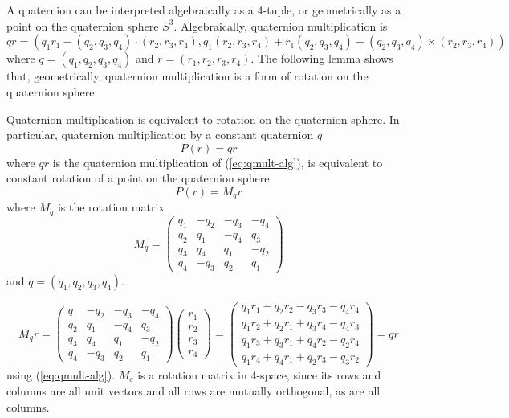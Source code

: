 \section{}

A quaternion can be interpreted algebraically as a 4-tuple,
or geometrically as a point on the quaternion sphere $S^3$.
Algebraically, quaternion multiplication \cite{hamilton69} is
\begin{equation}
\label{eq:qmult-alg}
	qr = (q_1 r_1 - (q_2,q_3,q_4) \cdot (r_2,r_3,r_4),
	      q_1 (r_2,r_3,r_4) + r_1 (q_2,q_3,q_4) + 
	      (q_2,q_3,q_4) \times (r_2,r_3,r_4))
\end{equation}
where $q=(q_1,q_2,q_3,q_4)$ and $r=(r_1,r_2,r_3,r_4)$.
The following lemma shows that, geometrically, quaternion multiplication
is a form of rotation on the quaternion sphere.

\begin{lemma}
\label{lem:multisrotation}
Quaternion multiplication is equivalent to rotation
on the quaternion sphere.
In particular, quaternion multiplication by a constant quaternion $q$
\[
  P(r) = qr
\]
where $qr$ is the quaternion multiplication of (\ref{eq:qmult-alg}),
is equivalent to constant rotation of a point on the quaternion sphere
\[
  P(r) = M_q r
\]
where $M_q$ is the rotation matrix
\begin{equation}
M_q = 
	\left( \begin{array}{cccc}
	q_1 & -q_2 & -q_3 & -q_4 \\
	q_2 & q_1  & -q_4 & q_3  \\
	q_3 & q_4  & q_1  & -q_2 \\
	q_4 & -q_3 & q_2  & q_1
	\end{array} \right)
\end{equation}
and $q = (q_1,q_2,q_3,q_4)$.
\end{lemma}
\prf
\[
M_q r = 
	\left( \begin{array}{cccc}
	q_1 & -q_2 & -q_3 & -q_4 \\
	q_2 & q_1  & -q_4 & q_3  \\
	q_3 & q_4  & q_1  & -q_2 \\
	q_4 & -q_3 & q_2  & q_1
	\end{array} \right)
	\left( \begin{array}{c} r_1 \\ r_2 \\ r_3 \\ r_4 \end{array} \right)
      = \left( \begin{array}{c}
	q_1 r_1 - q_2 r_2 - q_3 r_3 - q_4 r_4 \\
	q_1 r_2 + q_2 r_1 + q_3 r_4 - q_4 r_3 \\
	q_1 r_3 + q_3 r_1 + q_4 r_2 - q_2 r_4 \\
	q_1 r_4 + q_4 r_1 + q_2 r_3 - q_3 r_2
	\end{array} \right)
      = qr
\]
using (\ref{eq:qmult-alg}).
$M_q$ is a rotation matrix in 4-space, since its rows and columns are all unit
vectors and all rows are mutually orthogonal, as are all columns.
\QED

